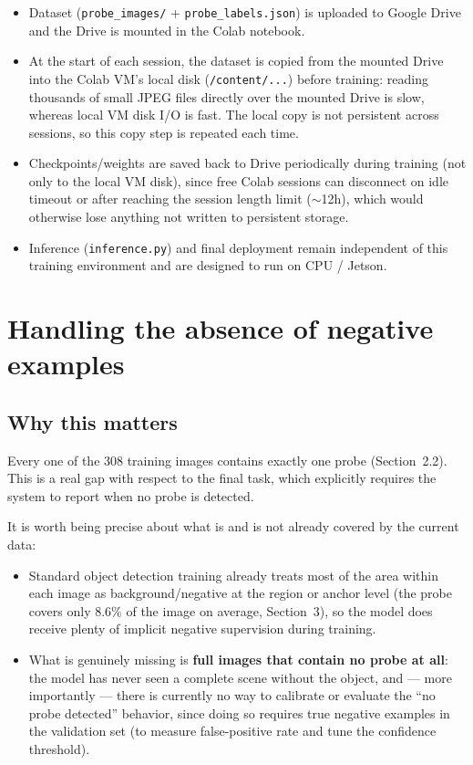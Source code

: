\documentclass[11pt,a4paper]{article}
\begin{document}
\begin{itemize}[nosep]
    \item Dataset (\texttt{probe\_images/} + \texttt{probe\_labels.json}) is uploaded to Google
          Drive and the Drive is mounted in the Colab notebook.
    \item At the start of each session, the dataset is copied from the mounted Drive into the
          Colab VM's local disk (\texttt{/content/...}) before training: reading thousands of
          small JPEG files directly over the mounted Drive is slow, whereas local VM disk I/O is
          fast. The local copy is not persistent across sessions, so this copy step is repeated
          each time.
    \item Checkpoints/weights are saved back to Drive periodically during training (not only to
          the local VM disk), since free Colab sessions can disconnect on idle timeout or after
          reaching the session length limit ($\sim$12h), which would otherwise lose anything not
          written to persistent storage.
    \item Inference (\texttt{inference.py}) and final deployment remain independent of this
          training environment and are designed to run on CPU / Jetson.
\end{itemize}

\section{Handling the absence of negative examples}
\label{sec:negatives}

\subsection{Why this matters}

Every one of the 308 training images contains exactly one probe (Section~2.2). This is a real
gap with respect to the final task, which explicitly requires the system to report when no probe
is detected.

It is worth being precise about what is and is not already covered by the current data:
\begin{itemize}[nosep]
    \item Standard object detection training already treats most of the area within each image
          as background/negative at the region or anchor level (the probe covers only 8.6\% of
          the image on average, Section~3), so the model does receive plenty of implicit negative
          supervision during training.
    \item What is genuinely missing is \textbf{full images that contain no probe at all}: the
          model has never seen a complete scene without the object, and --- more importantly ---
          there is currently no way to calibrate or evaluate the ``no probe detected'' behavior,
          since doing so requires true negative examples in the validation set (to measure
          false-positive rate and tune the confidence threshold).
\end{itemize}
\end{document}
